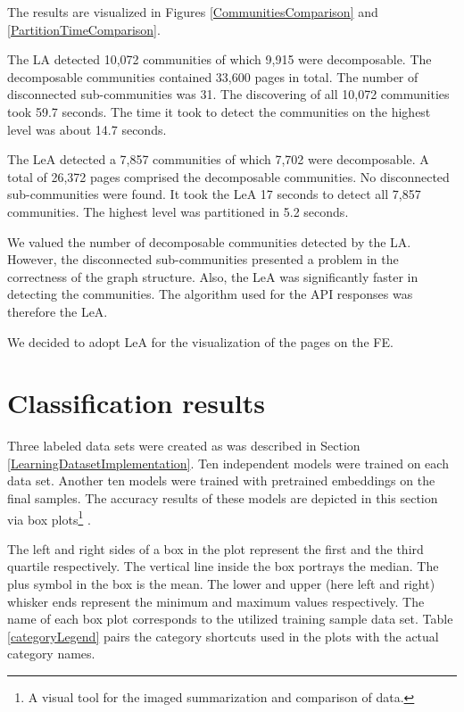 The results are visualized in Figures \ref{CommunitiesComparison} and \ref{PartitionTimeComparison}. 

The LA detected 10,072 communities of which 9,915 were decomposable. The decomposable communities contained 33,600 pages in total. The number of disconnected sub-communities was 31. The discovering of all 10,072 communities took 59.7 seconds. The time it took to detect the communities on the highest level was about 14.7 seconds. 

The LeA detected a 7,857 communities of which 7,702 were decomposable. A total of 26,372 pages comprised the decomposable communities. No disconnected sub-communities were found. It took the LeA 17 seconds to detect all 7,857 communities. The highest level was partitioned in 5.2 seconds. 

We valued the number of decomposable communities detected by the LA. However, the disconnected sub-communities presented a problem in the correctness of the graph structure. Also, the LeA was significantly faster in detecting the communities. The algorithm used for the API responses was therefore the LeA. 

We decided to adopt LeA for the visualization of the pages on the FE. 

\section{Classification results}\label{classificationEvaluation}
Three labeled data sets were created as was described in Section \ref{LearningDatasetImplementation}. Ten independent models were trained on each data set. Another ten models were trained with pretrained embeddings on the final samples. The accuracy results of these models are depicted in this section via box plots\footnote{A visual tool for the imaged summarization and comparison of data.} \cite{boxplot}. 

The left and right sides of a box in the plot represent the first and the third quartile respectively. The vertical line inside the box portrays the median. The plus symbol in the box is the mean. The lower and upper (here left and right) whisker ends represent the minimum and maximum values respectively. The name of each box plot corresponds to the utilized training sample data set. Table \ref{categoryLegend} pairs the category shortcuts used in the plots with the actual category names. 

